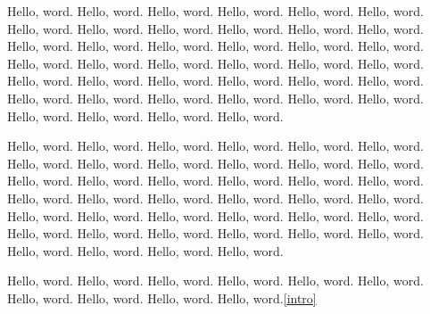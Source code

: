 \documentclass[5p]{elsarticle} %
\begin{document}
Hello, word. Hello, word. Hello, word. Hello, word. Hello, word. Hello, word. Hello, word. Hello, word. Hello, word. Hello, word. \cite{SunCHSX21}
Hello, word. Hello, word. Hello, word. Hello, word. Hello, word. Hello, word. Hello, word. Hello, word. Hello, word. Hello, word. \cite{SunCHSX21}
Hello, word. Hello, word. Hello, word. Hello, word. Hello, word. Hello, word. Hello, word. Hello, word. Hello, word. Hello, word. \cite{SunCHSX21}
Hello, word. Hello, word. Hello, word. Hello, word. Hello, word. Hello, word. Hello, word. Hello, word. Hello, word. Hello, word. \cite{SunCHSX21}

Hello, word. Hello, word. Hello, word. Hello, word. Hello, word. Hello, word. Hello, word. Hello, word. Hello, word. Hello, word. \cite{SunCHSX21}
Hello, word. Hello, word. Hello, word. Hello, word. Hello, word. Hello, word. Hello, word. Hello, word. Hello, word. Hello, word. \cite{SunCHSX21}
Hello, word. Hello, word. Hello, word. Hello, word. Hello, word. Hello, word. Hello, word. Hello, word. Hello, word. Hello, word. \cite{SunCHSX21}
Hello, word. Hello, word. Hello, word. Hello, word. Hello, word. Hello, word. Hello, word. Hello, word. Hello, word. Hello, word. \cite{SunCHSX21}

Hello, word. Hello, word. Hello, word. Hello, word. Hello, word. Hello, word. Hello, word. Hello, word. Hello, word. Hello, word.\ref{intro}






%
%
%
\end{document}
